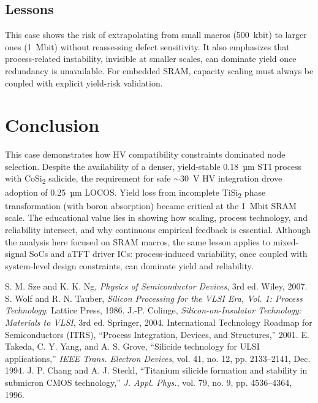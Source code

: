 \documentclass[conference]{IEEEtran}
\begin{document}
\subsection{Lessons}
This case shows the risk of extrapolating from small macros (500~kbit) to larger ones (1~Mbit) without reassessing defect sensitivity.
It also emphasizes that process-related instability, invisible at smaller scales, can dominate yield once redundancy is unavailable.
For embedded SRAM, capacity scaling must always be coupled with explicit yield-risk validation.

\section{Conclusion}
This case demonstrates how HV compatibility constraints dominated node selection.
Despite the availability of a denser, yield-stable 0.18~µm STI process with CoSi\textsubscript{2} salicide, the requirement for safe $\sim$30~V HV integration drove adoption of 0.25~µm LOCOS.
Yield loss from incomplete TiSi\textsubscript{2} phase transformation (with boron absorption) became critical at the 1~Mbit SRAM scale.
The educational value lies in showing how scaling, process technology, and reliability intersect, and why continuous empirical feedback is essential.
Although the analysis here focused on SRAM macros, the same lesson applies to mixed-signal SoCs and aTFT driver ICs: process-induced variability, once coupled with system-level design constraints, can dominate yield and reliability.

\begin{thebibliography}{99}
 S. M. Sze and K. K. Ng, \textit{Physics of Semiconductor Devices}, 3rd ed. Wiley, 2007.
 S. Wolf and R. N. Tauber, \textit{Silicon Processing for the VLSI Era, Vol. 1: Process Technology}. Lattice Press, 1986.
 J.-P. Colinge, \textit{Silicon-on-Insulator Technology: Materials to VLSI}, 3rd ed. Springer, 2004.
 International Technology Roadmap for Semiconductors (ITRS), ``Process Integration, Devices, and Structures,'' 2001.
 E. Takeda, C. Y. Yang, and A. S. Grove, ``Silicide technology for ULSI applications,'' \textit{IEEE Trans. Electron Devices}, vol. 41, no. 12, pp. 2133--2141, Dec. 1994.
 J. P. Chang and A. J. Steckl, ``Titanium silicide formation and stability in submicron CMOS technology,'' \textit{J. Appl. Phys.}, vol. 79, no. 9, pp. 4536--4364, 1996.
\end{thebibliography}
\end{document}
